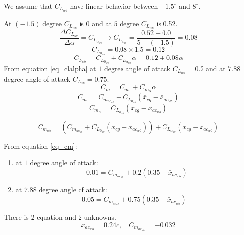 We assume that $C_{L_{wb}}$ have linear behavior between $-1.5^{\circ}$ and $8^{\circ}$.


At $(-1.5)$ degree $C_{L_{wb}}$ is $0$ and at $5$ degree $C_{L_{wb}}$ is 0.52.
$$\dfrac{\Delta C_{L_{wb}}}{\Delta \alpha} = C_{L_{\alpha_{wb}}}\to C_{L_{\alpha_{wb}}} = \dfrac{0.52 - 0.0}{5 - (-1.5)} = 0.08$$
$$
C_{L_{0_{wb}}} = 0.08 \times 1.5 = 0.12
$$
\begin{equation}
C_{L_{wb}}= C_{L_{0_{wb}}}+C_{L_{\alpha_{wb}}}\alpha = 0.12 + 0.08\alpha
\label{eq_clalpha}
\end{equation}
From equation \ref{eq_clalpha} at $1$ degree angle of attack $C_{L_{wb}} = 0.2$ and at $7.88$ degree angle of attack $C_{L_{wb}} = 0.75$.
\begin{equation}
C_m = C_{m_0} + C_{m_\alpha}\alpha
\label{eq_cm}
\end{equation}
\begin{equation}
C_{m_0} = C_{m_{ac_{wb}}} + C_{L_{0_{wb}}}(\bar x_{cg} - \bar x_{ac_{wb}})
\end{equation}
\begin{equation}
C_{m_\alpha} = C_{L_{\alpha_{wb}}}(\bar x_{cg} - \bar x_{ac_{wb}})
\end{equation}


\begin{equation}
C_{m_{wb}} = (C_{m_{ac_{wb}}} + C_{L_{0_{wb}}}(\bar x_{cg} - \bar x_{ac_{wb}})) +
C_{L_{\alpha_{wb}}}(\bar x_{cg} - \bar x_{ac_{wb}})
\label{eq_cm}
\end{equation}


From equation \ref{eq_cm}:
\begin{enumerate}
    \item at $1$ degree angle of attack:
    $$-0.01 = C_{m_{ac_{wb}}}  + 0.2 (0.35-\bar x_{ac_{wb}}) $$
    \item at $7.88$ degree angle of attack:
    $$0.05 =C_{m_{ac_{wb}}} +  0.75(0.35-\bar x_{ac_{wb}}) $$
\end{enumerate}
There is 2 equation and 2 unknowns.
$$x_{ac_{wb}} = 0.24c,\quad C_{m_{ac_{wb}}} = -0.032$$


